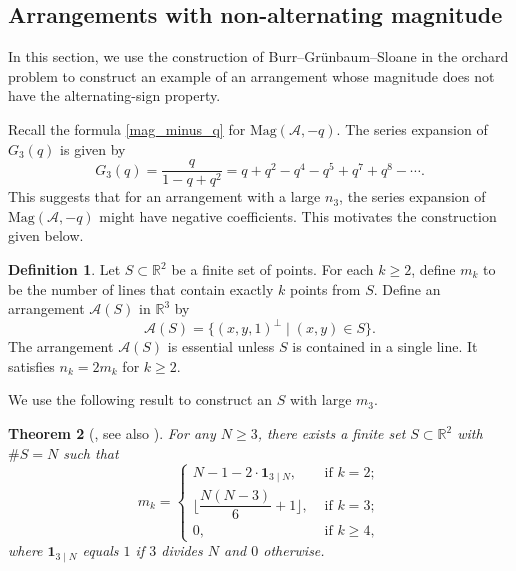 \documentclass{amsart}
\numberwithin{equation}{section}
\newtheorem{thm}{Theorem}[section]
\theoremstyle{plain}
\theoremstyle{remark}
\theoremstyle{definition}
\newtheorem{defn}[thm]{Definition}
\numberwithin{equation}{section}
\newcommand{\A}{\mathcal{A}}
\newcommand{\R}{\mathbb{R}}
\newcommand{\Mag}{\mathrm{Mag}}
\begin{document}
\subsection{Arrangements with non-alternating magnitude}
In this section, we use the construction of Burr--Gr\"unbaum--Sloane \cite{BGS} in the orchard problem to construct an example of an arrangement whose magnitude does not have the alternating-sign property.

Recall the formula \eqref{mag_minus_q} for $\Mag(\A,-q)$.
The series expansion of $G_3(q)$ is given by
\[
    G_3(q)=\dfrac{q}{1-q+q^2}=q+q^2-q^4-q^5+q^7+q^8-\cdots.
\]
This suggests that for an arrangement with a large $n_3$, the series expansion of $\Mag(\A,-q)$ might have negative coefficients.
This motivates the construction given below.

\begin{defn}
Let $S\subset \R^2$ be a finite set of points.
For each $k\geq 2$, define $m_k$ to be the number of lines that contain exactly $k$ points from $S$.
Define an arrangement $\A(S)$ in $\R^3$ by
\[
\A(S)=\{(x,y,1)^\perp\mid (x,y)\in S\}.
\]
The arrangement $\A(S)$ is essential unless $S$ is contained in a single line.
It satisfies $n_k=2m_k$ for $k\geq 2$.
\end{defn}

We use the following result to construct an $S$ with large $m_3$.

\begin{thm}[{\cite[Theorem 1]{BGS}}, see also {\cite[Proposition 2.6]{GreenTao}}]\label{thm:large_m3}
    For any $N\geq 3$, there exists a finite set $S\subset \R^2$ with $\#S=N$ such that
    \[
    m_k=\begin{cases}
        N-1-2\cdot \mathbf{1}_{3\mid N},&\text{ if }k=2;\\
        \biggl\lfloor\dfrac{N(N-3)}{6}+1\biggr\rfloor,&\text{ if }k=3;\\
        0,&\text{ if }k\geq 4,
    \end{cases}
    \]
    where $\mathbf{1}_{3\mid N}$ equals $1$ if $3$ divides $N$ and $0$ otherwise.
\end{thm}
\end{document}
